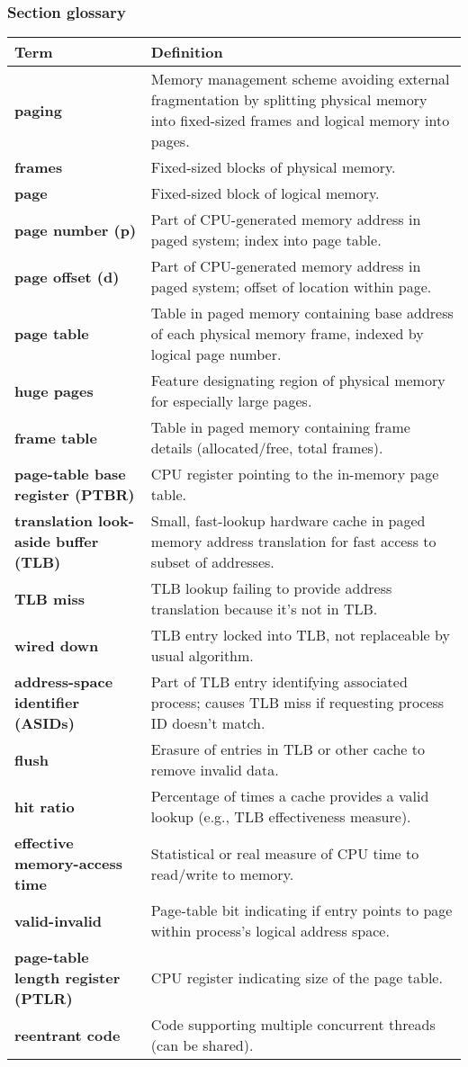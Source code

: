 \subsubsection*{Section glossary}
\begin{tabular}{p{}p{}}
    \toprule
    \textbf{Term} & \textbf{Definition} \\
    \midrule
    \textbf{paging} & Memory management scheme avoiding external fragmentation by splitting physical memory into fixed-sized frames and logical memory into pages. \\
    \textbf{frames} & Fixed-sized blocks of physical memory. \\
    \textbf{page} & Fixed-sized block of logical memory. \\
    \textbf{page number (p)} & Part of CPU-generated memory address in paged system; index into page table. \\
    \textbf{page offset (d)} & Part of CPU-generated memory address in paged system; offset of location within page. \\
    \textbf{page table} & Table in paged memory containing base address of each physical memory frame, indexed by logical page number. \\
    \textbf{huge pages} & Feature designating region of physical memory for especially large pages. \\
    \textbf{frame table} & Table in paged memory containing frame details (allocated/free, total frames). \\
    \textbf{page-table base register (PTBR)} & CPU register pointing to the in-memory page table. \\
    \textbf{translation look-aside buffer (TLB)} & Small, fast-lookup hardware cache in paged memory address translation for fast access to subset of addresses. \\
    \textbf{TLB miss} & TLB lookup failing to provide address translation because it's not in TLB. \\
    \textbf{wired down} & TLB entry locked into TLB, not replaceable by usual algorithm. \\
    \textbf{address-space identifier (ASIDs)} & Part of TLB entry identifying associated process; causes TLB miss if requesting process ID doesn't match. \\
    \textbf{flush} & Erasure of entries in TLB or other cache to remove invalid data. \\
    \textbf{hit ratio} & Percentage of times a cache provides a valid lookup (e.g., TLB effectiveness measure). \\
    \textbf{effective memory-access time} & Statistical or real measure of CPU time to read/write to memory. \\
    \textbf{valid-invalid} & Page-table bit indicating if entry points to page within process's logical address space. \\
    \textbf{page-table length register (PTLR)} & CPU register indicating size of the page table. \\
    \textbf{reentrant code} & Code supporting multiple concurrent threads (can be shared). \\
    \bottomrule
\end{tabular}
